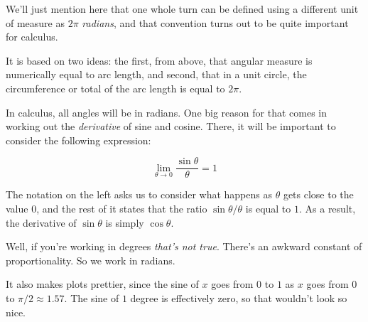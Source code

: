 \documentclass[11pt, oneside]{article}
\begin{document}
We'll just mention here that one whole turn can be defined using a different unit of measure as $2 \pi$ \emph{radians}, and that convention turns out to be quite important for calculus.

It is based on two ideas:  the first, from above, that angular measure is numerically equal to arc length, and second, that in a unit circle, the circumference or total of the arc length is equal to $2 \pi$.

In calculus, all angles will be in radians.  One big reason for that comes in working out the \emph{derivative} of sine and cosine.  There, it will be important to consider the following expression:

\[ \lim_{\theta \rightarrow 0} \frac{\sin \theta}{\theta} = 1 \]

The notation on the left asks us to consider what happens as $\theta$ gets close to the value $0$, and the rest of it states that the ratio $\sin \theta/\theta$ is equal to $1$.  As a result, the derivative of $\sin \theta$ is simply $\cos \theta$.

Well, if you're working in degrees \emph{that's not true}.  There's an awkward constant of proportionality.  So we work in radians.  

It also makes plots prettier, since the sine of $x$ goes from $0$ to $1$ as $x$ goes from $0$ to $\pi/2 \approx 1.57$.  The sine of $1$ degree is effectively zero, so that wouldn't look so nice.
\end{document}
